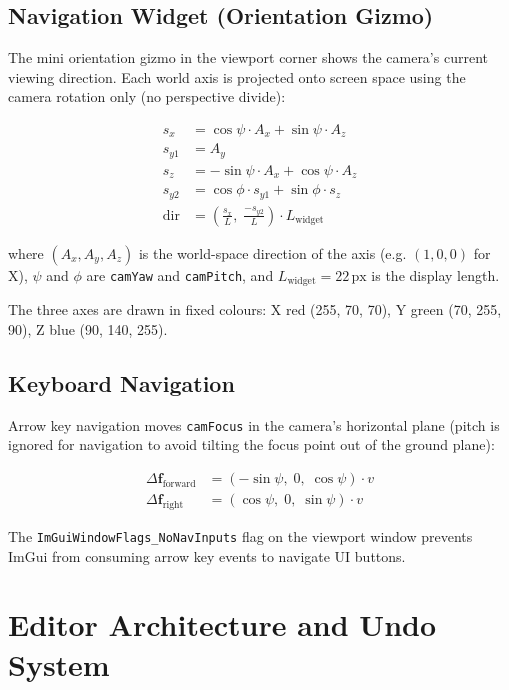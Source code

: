 \documentclass[12pt, a4paper]{report}
\theoremstyle{definition}
\theoremstyle{remark}
\begin{document}
\section{Navigation Widget (Orientation Gizmo)}

The mini orientation gizmo in the viewport corner shows the camera's
current viewing direction. Each world axis is projected onto screen space
using the camera rotation only (no perspective divide):

\begin{align}
  s_x   &=  \cos\psi \cdot A_x + \sin\psi \cdot A_z \\
  s_{y1} &= A_y \\
  s_z   &= -\sin\psi \cdot A_x + \cos\psi \cdot A_z \\
  s_{y2} &= \cos\phi \cdot s_{y1} + \sin\phi \cdot s_z \\
  \text{dir} &= \left(\frac{s_x}{L},\; \frac{-s_{y2}}{L}\right) \cdot L_\text{widget}
\end{align}

where $(A_x, A_y, A_z)$ is the world-space direction of the axis (e.g.
$(1, 0, 0)$ for X), $\psi$ and $\phi$ are \texttt{camYaw} and
\texttt{camPitch}, and $L_\text{widget} = 22\,\text{px}$ is the display
length.

The three axes are drawn in fixed colours: X red (255, 70, 70),
Y green (70, 255, 90), Z blue (90, 140, 255).

\section{Keyboard Navigation}

Arrow key navigation moves \texttt{camFocus} in the camera's horizontal
plane (pitch is ignored for navigation to avoid tilting the focus point
out of the ground plane):

\begin{align}
  \Delta\mathbf{f}_\text{forward}  &= (-\sin\psi,\; 0,\;  \cos\psi) \cdot v \\
  \Delta\mathbf{f}_\text{right}    &= ( \cos\psi,\; 0,\;  \sin\psi) \cdot v
\end{align}

The \texttt{ImGuiWindowFlags\_NoNavInputs} flag on the viewport window
prevents ImGui from consuming arrow key events to navigate UI buttons.

\chapter{Editor Architecture and Undo System}
\end{document}
